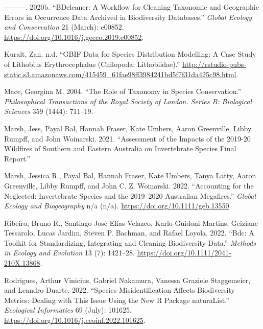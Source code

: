 \documentclass[
  letterpaper,
  DIV=11,
  numbers=noendperiod,
  oneside]{scrreprt}
\newlength{\cslhangindent}
\newlength{\cslentryspacingunit} %
\newenvironment{CSLReferences}[2] %
 {%
  \setlength{\parindent}{0pt}
  \ifodd #1
  \let\oldpar\par
  \def\par{\hangindent=\cslhangindent\oldpar}
  \fi
  \setlength{\parskip}{#2\cslentryspacingunit}
 }%
 {}
\begin{document}
\begin{CSLReferences}{1}{0}
\leavevmode{}%
---------. 2020b. {``BDcleaner: A Workflow for Cleaning Taxonomic and
Geographic Errors in Occurrence Data Archived in Biodiversity
Databases.''} \emph{Global Ecology and Conservation} 21 (March): e00852.
\url{https://doi.org/10.1016/j.gecco.2019.e00852}.

\leavevmode{}%
Kuralt, Zan. n.d. {``GBIF Data for Species Distribution Modelling: A
Case Study of Lithobius Erythrocephalus (Chilopoda: Lithobiidae).''}
\url{http://rstudio-pubs-static.s3.amazonaws.com/415459_61fae98ff3984241bd5f7f31da425c98.html}.

\leavevmode{}%
Mace, Georgina M. 2004. {``The Role of Taxonomy in Species
Conservation.''} \emph{Philosophical Transactions of the Royal Society
of London. Series B: Biological Sciences} 359 (1444): 711--19.

\leavevmode{}%
Marsh, Jess, Payal Bal, Hannah Fraser, Kate Umbers, Aaron Greenville,
Libby Rumpff, and John Woinarski. 2021. {``Assessment of the Impacts of
the 2019-20 Wildfires of Southern and Eastern Australia on Invertebrate
Species Final Report.''}

\leavevmode{}%
Marsh, Jessica R., Payal Bal, Hannah Fraser, Kate Umbers, Tanya Latty,
Aaron Greenville, Libby Rumpff, and John C. Z. Woinarski. 2022.
{``Accounting for the Neglected: {Invertebrate} Species and the
2019--2020 {Australian} Megafires.''} \emph{Global Ecology and
Biogeography} n/a (n/a). \url{https://doi.org/10.1111/geb.13550}.

\leavevmode{}%
Ribeiro, Bruno R., Santiago José Elías Velazco, Karlo Guidoni-Martins,
Geiziane Tessarolo, Lucas Jardim, Steven P. Bachman, and Rafael Loyola.
2022. {``Bdc: {A} Toolkit for Standardizing, Integrating and Cleaning
Biodiversity Data.''} \emph{Methods in Ecology and Evolution} 13 (7):
1421--28. \url{https://doi.org/10.1111/2041-210X.13868}.

\leavevmode{}%
Rodrigues, Arthur Vinicius, Gabriel Nakamura, Vanessa Graziele
Staggemeier, and Leandro Duarte. 2022. {``Species Misidentification
Affects Biodiversity Metrics: {Dealing} with This Issue Using the New
{R} Package {naturaList}.''} \emph{Ecological Informatics} 69 (July):
101625. \url{https://doi.org/10.1016/j.ecoinf.2022.101625}.


\end{CSLReferences}
\end{document}
